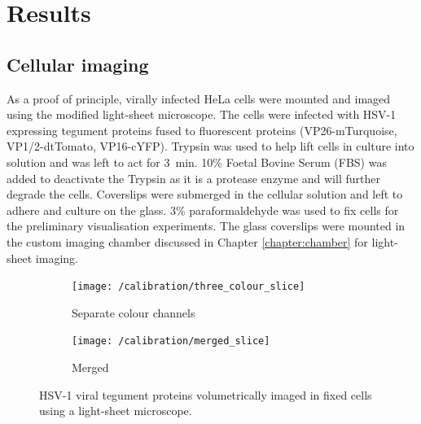 \section{Results}

\subsection{Cellular imaging}

As a proof of principle, virally infected HeLa cells were mounted and imaged using the modified light-sheet microscope.
The cells were infected with HSV-1 expressing tegument proteins fused to fluorescent proteins (VP26-mTurquoise, VP1/2-dtTomato, VP16-cYFP).
Trypsin was used to help lift cells in culture into solution and was left to act for \SI{3}{\minute}.
10\% Foetal Bovine Serum (FBS) was added to deactivate the Trypsin as it is a protease enzyme and will further degrade the cells.
Coverslips were submerged in the cellular solution and left to adhere and culture on the glass.
3\% paraformaldehyde was used to fix cells for the preliminary visualisation experiments.
The glass coverslips were mounted in the custom imaging chamber discussed in Chapter \ref{chapter:chamber} for light-sheet imaging.


\begin{figure}
	\centering
	\begin{subfigure}[b]{0.7\linewidth}
    \centering
    \texttt{[image: /calibration/three\_colour\_slice]}
    \caption{Separate colour channels}
    \label{fig:merged_slice}
	\end{subfigure}
	\begin{subfigure}[b]{0.2\linewidth}
    \centering
    \texttt{[image: /calibration/merged\_slice]}
    \caption{Merged}
    \label{fig:three_colour_slice}
	\end{subfigure}
	\caption{HSV-1 viral tegument proteins volumetrically imaged in fixed cells using a light-sheet microscope.}
	\label{fig:virus_image}
\end{figure}

